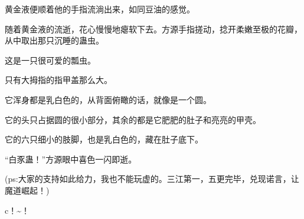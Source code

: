 \begin{this_body}
黄金液便顺着他的手指流淌出来，如同豆油的感觉。

随着黄金液的流逝，花心慢慢地瘪软下去。方源手指搓动，捻开柔嫩至极的花瓣，从中取出那只沉睡的蛊虫。

这是一只很可爱的瓢虫。

只有大拇指的指甲盖那么大。

它浑身都是乳白色的，从背面俯瞰的话，就像是一个圆。

它的头只占据圆的很小部分，其余的都是它肥肥的肚子和亮亮的甲壳。

它的六只细小的肢脚，也是乳白色的，藏在肚子底下。

“白豕蛊！”方源眼中喜色一闪即逝。

(ps:大家的支持如此给力，我也不能玩虚的。三江第一，五更完毕，兑现诺言，让魔道崛起！)

c！\~{}！

\end{this_body}

